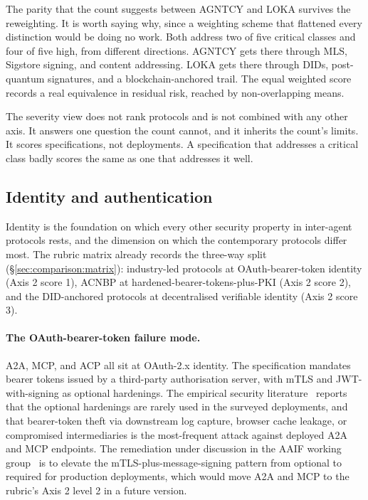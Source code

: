 The parity that the count suggests between AGNTCY and LOKA
survives the reweighting. It is worth saying why, since
a weighting scheme that flattened every distinction would
be doing no work. Both address two of five critical classes
and four of five high, from different directions. AGNTCY
gets there through MLS, Sigstore signing, and content
addressing. LOKA gets there through DIDs, post-quantum
signatures, and a blockchain-anchored trail. The equal weighted score records
a real equivalence in residual risk, reached by
non-overlapping means.

The severity view does not rank protocols and is not
combined with any other axis. It answers one question the
count cannot, and it inherits the count's limits. It scores
specifications, not deployments. A specification that
addresses a critical class badly scores the same as one
that addresses it well.

\subsection{Identity and authentication}
\label{sec:security:identity}

Identity is the foundation on which every other security
property in inter-agent protocols rests, and the dimension
on which the contemporary protocols differ most. The rubric
matrix already records the three-way split
(\S\ref{sec:comparison:matrix}): industry-led protocols at
OAuth-bearer-token identity (Axis 2 score 1), ACNBP at
hardened-bearer-tokens-plus-PKI (Axis 2 score 2), and the
DID-anchored protocols at decentralised verifiable
identity (Axis 2 score 3).

\paragraph{The OAuth-bearer-token failure mode.}
A2A, MCP, and ACP all sit at OAuth-2.x identity. The
specification mandates bearer tokens issued by a third-party
authorisation server, with mTLS and JWT-with-signing as
optional hardenings. The empirical security
literature~\cite{a2asecbench, a2a_weaknesses} reports that
the optional hardenings are rarely used in the surveyed
deployments, and that bearer-token theft via downstream
log capture, browser cache leakage, or compromised
intermediaries is the most-frequent attack against deployed
A2A and MCP endpoints. The remediation under discussion in
the AAIF working group~\cite{lf_aaif} is to elevate the
mTLS-plus-message-signing pattern from optional to required
for production deployments, which would move A2A and MCP to
the rubric's Axis 2 level 2 in a future version.

